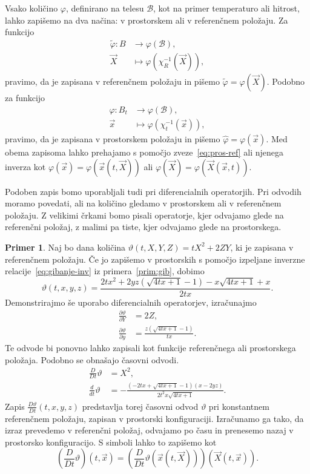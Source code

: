 \documentclass[12pt,a4paper,twoside]{article}
\theoremstyle{definition} %
\newtheorem{primer}[definicija]{Primer}
\theoremstyle{plain} %
\numberwithin{equation}{section}
\newcommand{\B}{\mathcal{B}}
\renewcommand{\phi}{\varphi}
\newcommand{\dpar}[2]{\ensuremath{\frac{\partial #1}{\partial #2}}}
\newcommand{\dd}[2]{\ensuremath{\frac{d #1}{d #2}}}
\newcommand{\ddt}[1]{\dd{#1}{t}}
\newcommand{\DD}[2]{\ensuremath{\frac{D #1}{D #2}}}
\newcommand{\DDt}[1]{\DD{#1}{t}}
\newcommand{\vX}{\vec{X}}
\newcommand{\vx}{\vec{x}}
\begin{document}
Vsako količino $\phi$, definirano na telesu $\B$, kot na primer temperaturo ali hitrost, lahko
zapišemo na dva načina: v prostorskem ali v referenčnem položaju. Za funkcijo
\begin{align}
  \tilde \phi\colon B &\to \phi(\B), \nonumber \\
  \vX&\mapsto \phi(\chi_R^{-1}(\vX)), \label{eq:toref}
\end{align}
pravimo, da je zapisana v referenčnem položaju in pišemo $\tilde\phi =
\phi(\vX)$.
Podobno za funkcijo
\begin{align}
  \hat \phi\colon B_t &\to \phi(\B), \nonumber \\
  \vx&\mapsto \phi(\chi_t^{-1}(\vx)), \label{eq:topro}
\end{align}
pravimo, da je zapisana v prostorskem položaju in pišemo $\hat\phi = \phi(\vx)$.
Med obema zapisoma lahko prehajamo s pomočjo zveze~\eqref{eq:pros-ref} ali njenega inverza kot
$\phi(\vx) = \phi(\vx(t, \vX))$ ali $\phi(\vX) = \phi(\vX(\vx, t))$.

Podoben zapis bomo uporabljali tudi pri diferencialnih operatorjih. Pri odvodih
moramo povedati, ali na količino gledamo v prostorskem ali v referenčnem
položaju. Z velikimi črkami bomo pisali operatorje, kjer odvajamo glede na
referenčni položaj, z malimi pa tiste, kjer odvajamo glede na prostorskega.

\begin{primer}
  Naj bo dana količina $\vartheta(t, X, Y, Z) = tX^2 + 2 ZY$, ki je zapisana v
  referenčnem položaju. Če jo zapišemo v prostorskih s pomočjo izpeljane
  inverzne relacije~\eqref{eq:gibanje-inv} iz primera~\ref{prim:gib}, dobimo
  \begin{equation*}
    \vartheta(t, x, y, z) = \frac{2 t x^2+2 y z \left(\sqrt{4 t x+1}-1\right)-x
    \sqrt{4 t x+1}+x}{2 t x}.
  \end{equation*}
  Demonstrirajmo še uporabo diferencialnih operatorjev, izračunajmo
  \begin{align*}
    \dpar{\vartheta}{Y} &= 2Z,  \\
    \dpar{\vartheta}{y} &= \frac{z \left(\sqrt{4 t x+1}-1\right)}{t x}.
  \end{align*}
  Te odvode bi ponovno lahko zapisali kot funkcije referenčnega ali prostorskega položaja. Podobno se
  obnašajo časovni odvodi.
  \begin{align*}
    \DDt{} \vartheta &= X^2, \\
    \ddt{} \vartheta &=  -\frac{\left(-2 t x+\sqrt{4 t x+1}-1\right) (x-2 y
    z)}{2 t^2 x \sqrt{4 t x+1}}.
  \end{align*}
  Zapis $\DDt \vartheta(t, x, y, z)$ predstavlja torej časovni odvod $\vartheta$ pri konstantnem
  referenčnem položaju, zapisan v prostorski konfiguraciji. Izračunamo ga tako, da izraz prevedemo
  v referenčni položaj, odvajamo po času in prenesemo nazaj v prostorsko konfiguracijo. S simboli
  lahko to zapišemo kot
  \begin{equation}
    \left(\DDt{} \vartheta\right)(t, \vx) = \left( \DDt{}\vartheta(\vx(t, \vX))
    \right)(\vX(t, \vx)).
  \end{equation}
\end{primer}
\end{document}
